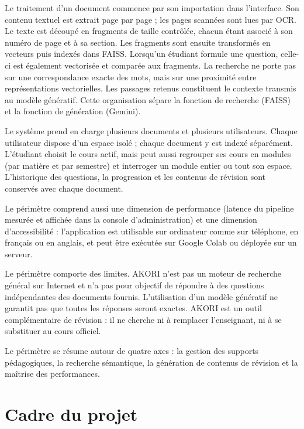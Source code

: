 \documentclass[12pt,a4paper,oneside]{report}
\begin{document}
Le traitement d'un document commence par son importation dans l'interface. Son contenu textuel est extrait page par page ; les pages scannées sont lues par OCR. Le texte est découpé en fragments de taille contrôlée, chacun étant associé à son numéro de page et à sa section. Les fragments sont ensuite transformés en vecteurs puis indexés dans FAISS. Lorsqu'un étudiant formule une question, celle-ci est également vectorisée et comparée aux fragments. La recherche ne porte pas sur une correspondance exacte des mots, mais sur une proximité entre représentations vectorielles. Les passages retenus constituent le contexte transmis au modèle génératif. Cette organisation sépare la fonction de recherche (FAISS) et la fonction de génération (Gemini).

Le système prend en charge plusieurs documents et plusieurs utilisateurs. Chaque utilisateur dispose d'un espace isolé ; chaque document y est indexé séparément. L'étudiant choisit le cours actif, mais peut aussi regrouper ses cours en modules (par matière et par semestre) et interroger un module entier ou tout son espace. L'historique des questions, la progression et les contenus de révision sont conservés avec chaque document.

Le périmètre comprend aussi une dimension de performance (latence du pipeline mesurée et affichée dans la console d'administration) et une dimension d'accessibilité : l'application est utilisable sur ordinateur comme sur téléphone, en français ou en anglais, et peut être exécutée sur Google Colab ou déployée sur un serveur.

Le périmètre comporte des limites. AKORI n'est pas un moteur de recherche général sur Internet et n'a pas pour objectif de répondre à des questions indépendantes des documents fournis. L'utilisation d'un modèle génératif ne garantit pas que toutes les réponses seront exactes. AKORI est un outil complémentaire de révision : il ne cherche ni à remplacer l'enseignant, ni à se substituer au cours officiel.

Le périmètre se résume autour de quatre axes : la gestion des supports pédagogiques, la recherche sémantique, la génération de contenus de révision et la maîtrise des performances.

\chapter{Cadre du projet}
\end{document}
